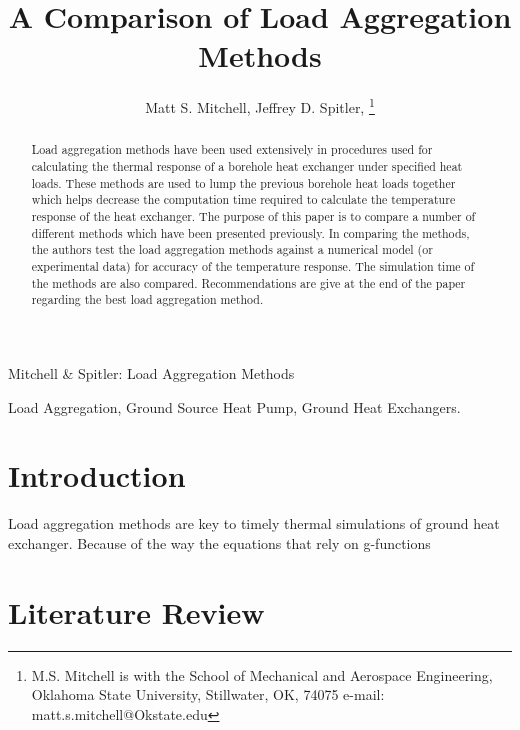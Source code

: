 \documentclass[journal]{../IEEE_Template/IEEEtran}
\begin{document}
\title{A Comparison of Load Aggregation Methods}


\author{Matt S. Mitchell, 
        Jeffrey D. Spitler, 
\thanks{M.S. Mitchell is with the School of Mechanical and Aerospace Engineering, Oklahoma State University, Stillwater, OK, 74075 e-mail: matt.s.mitchell@Okstate.edu}%
}


%
{Mitchell \& Spitler: Load Aggregation Methods}

\maketitle

\begin{abstract}
Load aggregation methods have been used extensively in procedures used for calculating the thermal response of a borehole heat exchanger under specified heat loads. These methods are used to lump the previous borehole heat loads together which helps decrease the computation time required to calculate the temperature response of the heat exchanger. The purpose of this paper is to compare a number of different methods which have been presented previously. In comparing the methods, the authors test the load aggregation methods against a numerical model (or experimental data) for accuracy of the temperature response. The simulation time of the methods are also compared. Recommendations are give at the end of the paper regarding the best load aggregation method.
\end{abstract}

\begin{IEEEkeywords}
Load Aggregation, Ground Source Heat Pump, Ground Heat Exchangers.
\end{IEEEkeywords}


\section{Introduction}

Load aggregation methods are key to timely thermal simulations of ground heat exchanger. Because of the way the equations that rely on g-functions \cite{Adams_Schweickart_1987}


\section{Literature Review}
\end{document}
